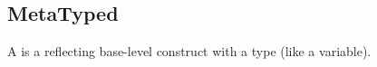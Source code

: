 \subsection{MetaTyped}
\label{concept-MetaTyped}

A  is a  reflecting base-level construct with a type
(like a variable).




